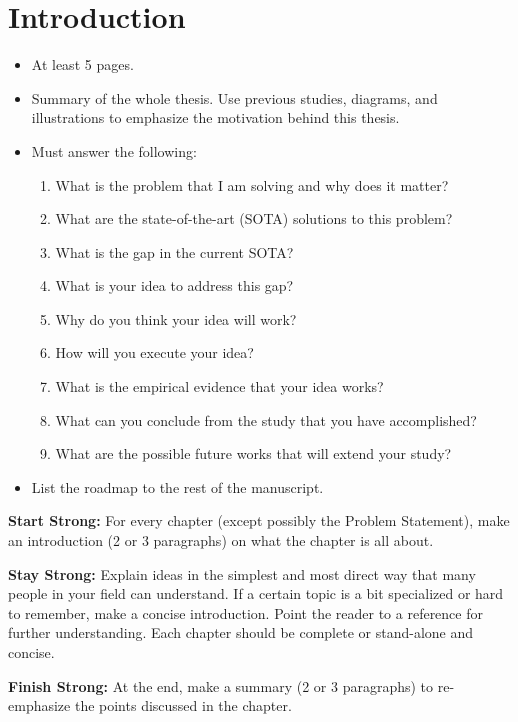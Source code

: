 \chapter{Introduction}

\begin{itemize}
    \item At least 5 pages.
    \item Summary of the whole thesis. Use previous studies, diagrams, and illustrations to emphasize the motivation behind this thesis.
    \item Must answer the following:
    \begin{enumerate}
        \item What is the problem that I am solving and why does it matter?
        \item What are the state-of-the-art (SOTA) solutions to this problem?
        \item What is the gap in the current SOTA?
        \item What is your idea to address this gap?
        \item Why do you think your idea will work?
        \item How will you execute your idea?
        \item What is the empirical evidence that your idea works?
        \item What can you conclude from the study that you have accomplished?
        \item What are the possible future works that will extend your study?
    \end{enumerate}
    \item List the roadmap to the rest of the manuscript.
\end{itemize}

\textbf{Start Strong:} For every chapter (except possibly the Problem Statement), make an introduction (2 or 3 paragraphs) on what the chapter is all about.

\textbf{Stay Strong:} Explain ideas in the simplest and most direct way that many people in your field can understand. If a certain topic is a bit specialized or hard to remember, make a concise introduction. Point the reader to a reference for further understanding. Each chapter should be complete or stand-alone and concise.

\textbf{Finish Strong:} At the end, make a summary (2 or 3 paragraphs) to re-emphasize the points discussed in the chapter.

